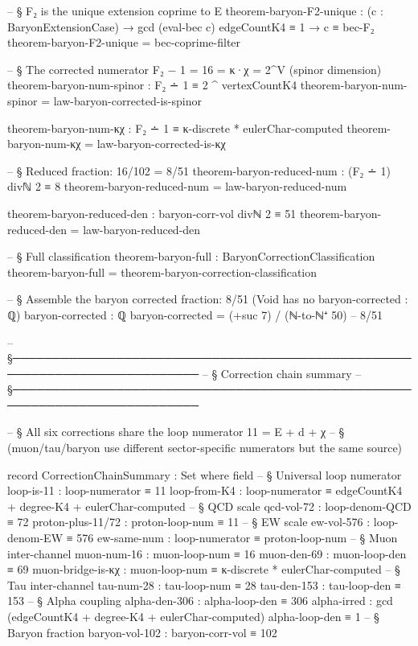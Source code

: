 \documentclass[11pt,a4paper]{book}
\begin{document}
\begin{code}
-- § F₂ is the unique extension coprime to E
theorem-baryon-F2-unique :
  (c : BaryonExtensionCase) →
  gcd (eval-bec c) edgeCountK4 ≡ 1 →
  c ≡ bec-F₂
theorem-baryon-F2-unique = bec-coprime-filter

-- § The corrected numerator F₂ − 1 = 16 = κ·χ = 2^V (spinor dimension)
theorem-baryon-num-spinor : F₂ ∸ 1 ≡ 2 ^ vertexCountK4
theorem-baryon-num-spinor = law-baryon-corrected-is-spinor

theorem-baryon-num-κχ : F₂ ∸ 1 ≡ κ-discrete * eulerChar-computed
theorem-baryon-num-κχ = law-baryon-corrected-is-κχ

-- § Reduced fraction: 16/102 = 8/51
theorem-baryon-reduced-num : (F₂ ∸ 1) divℕ 2 ≡ 8
theorem-baryon-reduced-num = law-baryon-reduced-num

theorem-baryon-reduced-den : baryon-corr-vol divℕ 2 ≡ 51
theorem-baryon-reduced-den = law-baryon-reduced-den

-- § Full classification
theorem-baryon-full : BaryonCorrectionClassification
theorem-baryon-full = theorem-baryon-correction-classification

-- § Assemble the baryon corrected fraction: 8/51 (Void has no baryon-corrected : ℚ)
baryon-corrected : ℚ
baryon-corrected = (+suc 7) / (ℕ-to-ℕ⁺ 50)   -- 8/51

-- §──────────────────────────────────────────────────────────────────────────
-- § Correction chain summary
-- §──────────────────────────────────────────────────────────────────────────

-- § All six corrections share the loop numerator 11 = E + d + χ
-- § (muon/tau/baryon use different sector-specific numerators but the same source)

record CorrectionChainSummary : Set where
  field
    -- § Universal loop numerator
    loop-is-11          : loop-numerator ≡ 11
    loop-from-K4        : loop-numerator ≡ edgeCountK4 + degree-K4 + eulerChar-computed
    -- § QCD scale
    qcd-vol-72          : loop-denom-QCD ≡ 72
    proton-plus-11/72   : proton-loop-num ≡ 11
    -- § EW scale
    ew-vol-576          : loop-denom-EW ≡ 576
    ew-same-num         : loop-numerator ≡ proton-loop-num
    -- § Muon inter-channel
    muon-num-16         : muon-loop-num ≡ 16
    muon-den-69         : muon-loop-den ≡ 69
    muon-bridge-is-κχ   : muon-loop-num ≡ κ-discrete * eulerChar-computed
    -- § Tau inter-channel
    tau-num-28          : tau-loop-num ≡ 28
    tau-den-153         : tau-loop-den ≡ 153
    -- § Alpha coupling
    alpha-den-306       : alpha-loop-den ≡ 306
    alpha-irred         : gcd (edgeCountK4 + degree-K4 + eulerChar-computed) alpha-loop-den ≡ 1
    -- § Baryon fraction
    baryon-vol-102      : baryon-corr-vol ≡ 102


\end{code}
\end{document}
